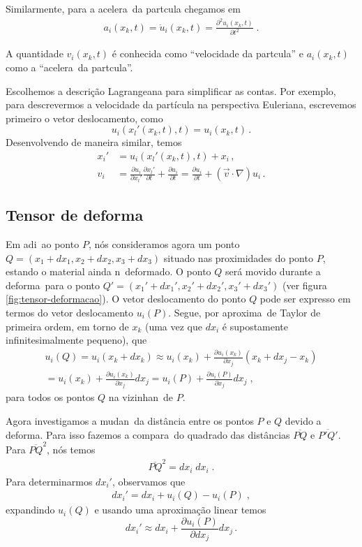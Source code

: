 Similarmente, para a acelera\cao\ da part\ih cula chegamos em
\begin{eqnarray}
a_i(x_k,t) = \ddot{u}_i(x_k,t) = \frac{\partial^2 u_i(x_k,t)}
{\partial t^2} \; .
\end{eqnarray}

A quantidade $v_i(x_k,t)$ \'e conhecida como ``velocidade
da part\ih cula'' e $a_i(x_k,t)$ como a ``acelera\cao\ da
part\ih cula''.

Escolhemos a descri\c{c}\~ao Lagrangeana para simplificar as contas. Por
exemplo, para descrevermos a velocidade da part\'icula na perspectiva Euleriana,
escrevemos primeiro o vetor deslocamento, como
\begin{equation}
   u_i(x_l'(x_k,t),t)=u_i(x_k,t) \, .
\end{equation}
Desenvolvendo de maneira similar, temos
\begin{align}
  x_i'&=u_i(x_l'(x_k,t),t) +  x_i \, , \\
  v_i &= \frac{\partial u_i}{\partial x_l'}\frac{\partial x_l'}{\partial t}
  +\frac{\partial u_i}{\partial t} = \frac{\partial u_i}{\partial t} +
  (\vec{v}\cdot\nabla)u_i \, .
\end{align}
\subsection{Tensor de deforma\cao}

Em adi\cao\ ao ponto $P$, n\'os consideramos agora um ponto
$Q=(x_1+dx_1,x_2+dx_2,x_3+dx_3)$ situado nas proximidades do
ponto $P$, estando o material ainda n\ao\ deformado. O
ponto $Q$ ser\'a movido durante a deforma\cao\ para o ponto
$Q'=(x_1'+dx_1',x_2'+dx_2',x_3'+dx_3')$ (ver figura \ref{fig:tensor-deformacao}). O vetor
deslocamento do ponto $Q$ pode ser expresso em termos do
vetor deslocamento $u_i(P)$. Segue, por aproxima\cao\ de Taylor de
primeira ordem, em torno de $x_k$ (uma vez que $dx_i$ \'e supostamente infinitesimalmente
pequeno), que
\begin{eqnarray} \label{vdq}
u_i(Q) = u_i(x_k+dx_k) \approx u_i(x_k) +
\frac{\partial u_i(x_k)}
{\partial x_j} (x_k + dx_j - x_k) \nonumber \\
 = u_i(x_k) +\frac{\partial u_i(x_k)}
{\partial x_j} dx_j = u_i(P) + \frac{\partial u_i(P)}
{\partial x_j} dx_j \; ,
\end{eqnarray}
para todos os pontos $Q$ na vizinhan\ca\ de $P$.


Agora investigamos a mudan\ca\ da dist\^ancia entre os pontos
$P$ e $Q$ devido a deforma\cao. Para isso fazemos a
compara\cao\ do quadrado das dist\^ancias $\overline{PQ}$
e $\overline{P'Q'}$.
Para $\overline{PQ}^2$, n\'os temos
\begin{eqnarray}
\overline{PQ}^2 = dx_i \; dx_i \; .
\end{eqnarray}
Para determinarmos $dx_i'$, observamos que
\begin{eqnarray}
dx_i' = dx_i + u_i(Q) - u_i(P)\; ,
\label{dxidxi}
\end{eqnarray}
expandindo $u_i(Q)$ e usando uma aproxima\c{c}\~ao linear temos
\begin{equation}
  dx_i' \approx dx_i + \frac{\partial u_i(P)}{\partial dx_j}dx_j \, .
\end{equation}


